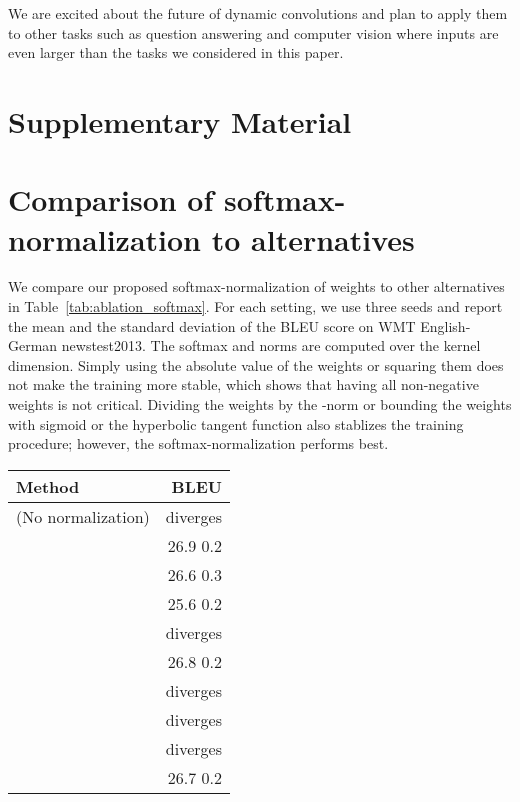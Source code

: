 \documentclass{article} \usepackage{iclr2019_conference,times}
\def\tvsdconv{DynamicConv}
\begin{document}
We are excited about the future of dynamic convolutions and plan to apply them to other tasks such as question answering and computer vision where inputs are even larger than the tasks we considered in this paper. 





\clearpage
\appendix
\section*{Supplementary Material}


\section{Comparison of softmax-normalization to alternatives}
\label{app:smnorm}

We compare our proposed softmax-normalization of weights to other alternatives in Table~\ref{tab:ablation_softmax}. 
For each setting, we use three seeds and report the mean and the standard deviation of the BLEU score on WMT English-German newstest2013. 
The softmax and norms are computed over the kernel dimension. 
Simply using the absolute value of the weights or squaring them does not make the training more stable, which shows that having all non-negative weights is not critical. 
Dividing the weights by the -norm or bounding the weights with sigmoid or the hyperbolic tangent function also stablizes the training procedure; however, the softmax-normalization performs best.

\begin{table*}[h]
\centering
\setlength\extrarowheight{5pt}
\begin{tabular}{lr}
\toprule
Method & BLEU \\
\midrule
 (No normalization) &  diverges \\
 & 26.9  0.2 \\
 & 26.6  0.3 \\
 & 25.6  0.2 \\
 & diverges \\
 & 26.8  0.2 \\
 & diverges \\
 & diverges \\
 & diverges \\
 & 26.7  0.2 \\
\bottomrule
\end{tabular}
\caption{Alternatives to softmax-normalization in \tvsdconv{} on WMT English-German newstest2013 ().}
\label{tab:ablation_softmax}
\end{table*}
\end{document}
